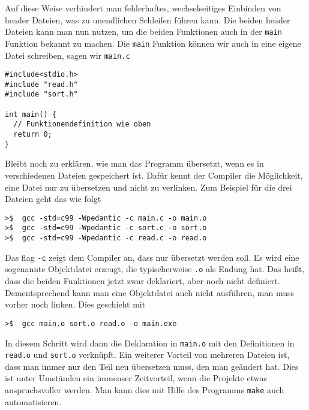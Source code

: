 Auf diese Weise verhindert man fehlerhaftes, wechselseitiges Einbinden von header Dateien, was zu unendlichen Schleifen führen kann.
Die beiden header Dateien kann man nun nutzen, um die beiden Funktionen auch in der \texttt{main} Funktion bekannt zu machen.
Die \texttt{main} Funktion können wir auch in eine eigene Datei schreiben, sagen wir \texttt{main.c}
\begin{lstlisting}[caption={Datei \texttt{main.c}}, belowcaptionskip=0.3em]
#include<stdio.h>
#include "read.h"
#include "sort.h"

int main() {
  // Funktionendefinition wie oben
  return 0;
}
\end{lstlisting}
Bleibt noch zu erklären, wie man das Programm übersetzt, wenn es in verschiedenen Dateien gespeichert ist.
Dafür kennt der Compiler die Möglichkeit, eine Datei nur zu übersetzen und nicht zu verlinken.
Zum Beispiel für die drei Dateien geht das wie folgt

\vspace*{0.5cm}
\begin{verbatim}
>$  gcc -std=c99 -Wpedantic -c main.c -o main.o
>$  gcc -std=c99 -Wpedantic -c sort.c -o sort.o
>$  gcc -std=c99 -Wpedantic -c read.c -o read.o
\end{verbatim}
\vspace*{0.5cm}

Das flag \texttt{-c} zeigt dem Compiler an, dass nur übersetzt werden soll.
Es wird eine sogenannte Objektdatei erzeugt, die typischerweise \texttt{.o} als Endung hat.
Das heißt, dass die beiden Funktionen jetzt zwar deklariert, aber noch nicht definiert.
Dementsprechend kann man eine Objektdatei auch nicht ausführen, man muss vorher noch linken.
Dies geschieht mit

\vspace*{0.5cm}
\begin{verbatim}
>$  gcc main.o sort.o read.o -o main.exe
\end{verbatim}
\vspace*{0.5cm}

In diesem Schritt wird dann die Deklaration in \texttt{main.o} mit den Definitionen in \texttt{read.o} und \texttt{sort.o} verknüpft.
Ein weiterer Vorteil von mehreren Dateien ist, dass man immer nur den Teil neu übersetzen muss, den man geändert hat.
Dies ist unter Umständen ein immenser Zeitvorteil, wenn die Projekte etwas anspruchsvoller werden.
Man kann dies mit Hilfe des Programms \texttt{make} auch automatisieren.

\endinput
